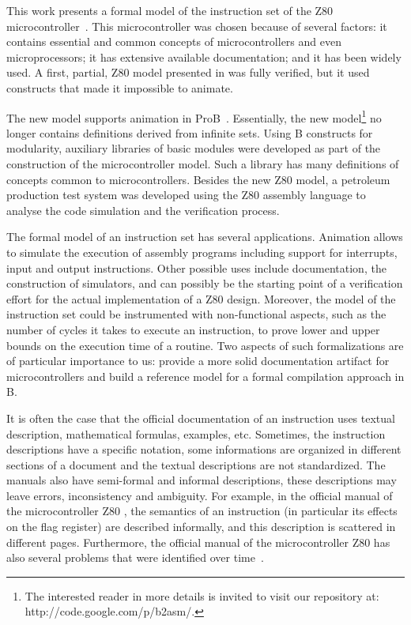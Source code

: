 \documentclass[a4paper]{llncs}
\begin{document}
This work presents a formal model of the instruction set of the Z80
microcontroller~\cite{Z80_manual}. This microcontroller was chosen
because of several factors: it contains essential and common concepts
of microcontrollers and even microprocessors; it has extensive
available documentation; and it has been widely used.  A first,
partial, Z80 model presented in \cite{Valerio_SBMF09} was fully
verified, but it used constructs that made it impossible to animate.

The new model supports animation in ProB~\cite{proB}.  Essentially, the
new model\footnote{The interested reader in more details is invited to visit our repository at: http://code.google.com/p/b2asm/.}
no longer contains definitions derived from infinite sets. Using B
constructs for modularity, auxiliary libraries of basic modules were
developed as part of the construction of the microcontroller model. Such
a library has many definitions of concepts common to microcontrollers.
Besides the new Z80 model, a petroleum production test system was
developed using the Z80 assembly language to analyse the code simulation
and the verification process.

The formal model of an instruction set has several
applications. Animation allows to simulate the execution of assembly
programs including support for interrupts, input and output
instructions. Other possible uses include documentation, the
construction of simulators, and can possibly be the starting point of
a verification effort for the actual implementation of a Z80
design. Moreover, the model of the instruction set could be
instrumented with non-functional aspects, such as the number of cycles
it takes to execute an instruction, to prove lower and upper bounds on
the execution time of a routine.  Two aspects of such formalizations
are of particular importance to us: provide a more solid documentation
artifact for microcontrollers and build a reference model for a formal
compilation approach in B.

It is often the case that the official documentation of an instruction
uses textual description, mathematical formulas, examples,
etc. Sometimes, the instruction descriptions have a specific notation,
some informations are organized in different sections of a document and
the textual descriptions are not standardized.  The manuals also have
semi-formal and informal descriptions, these descriptions may leave
errors, inconsistency and ambiguity.  For example, in the official
manual of the microcontroller Z80 \cite{Z80_manual}, the semantics of
an instruction (in particular its effects on the flag register) are
described informally, and this description is scattered in
different pages.  Furthermore, the official manual of the
microcontroller Z80 has also several problems that were identified
over time~\cite{UndocumentedZ80}.
\end{document}
